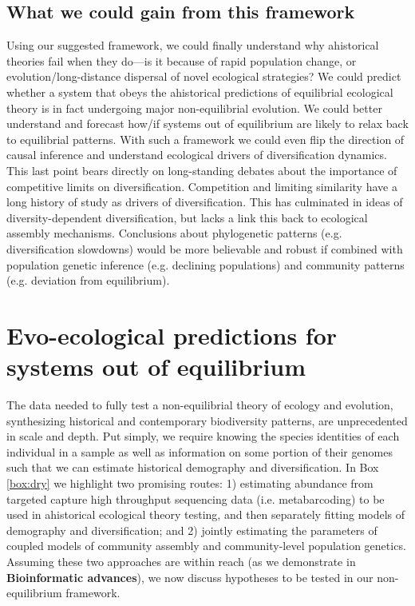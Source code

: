 \documentclass[12pt]{article}
\newcounter{Box}
\begin{document}
\subsection{What we could gain from this framework}

Using our suggested framework, we could finally understand why ahistorical theories fail when
they do---is it because of rapid population change, or
evolution/long-distance dispersal of novel ecological strategies? We
could predict whether a system that obeys the ahistorical predictions
of equilibrial ecological theory is in fact undergoing major
non-equilibrial evolution. We could better understand and forecast
how/if systems out of equilibrium are likely to relax back to
equilibrial patterns. With such a framework we could even flip the
direction of causal inference and understand ecological drivers of
diversification dynamics. This last point bears directly on
long-standing  debates about the importance of competitive
limits on diversification. Competition and limiting similarity have a
long history of study as drivers of diversification. This has
culminated in ideas of diversity-dependent
diversification\citep{Etienne2012-ky, Rabosky2013-gk, Rabosky2008-bs}, but lacks a
 link this back to ecological assembly
mechanisms. Conclusions about phylogenetic patterns (e.g. diversification
slowdowns) would be more believable and robust if combined with
population genetic inference (e.g. declining populations) and
community patterns (e.g.  deviation from equilibrium).

\section{Evo-ecological predictions for systems out of equilibrium} \label{sec:pred}

The data needed to fully test a non-equilibrial theory of ecology and
evolution, synthesizing historical and contemporary biodiversity
patterns, are unprecedented in scale and depth. Put simply, we require
knowing the species identities of each individual in a sample as well
as information on some portion of their genomes such that we can
estimate historical demography and diversification. In Box
\ref{box:dry} we
highlight two promising routes: 1) estimating abundance from targeted
capture high throughput sequencing data (i.e.  metabarcoding) to be
used in ahistorical ecological theory testing, and then separately
fitting models of demography and diversification; and 2) jointly
estimating the parameters of coupled models of community assembly and
community-level population genetics. Assuming these two approaches are within
% 
% 
% 
reach (as we demonstrate in \textbf{Bioinformatic advances}), we now
discuss hypotheses to be tested in our non-equilibrium framework.
\end{document}
